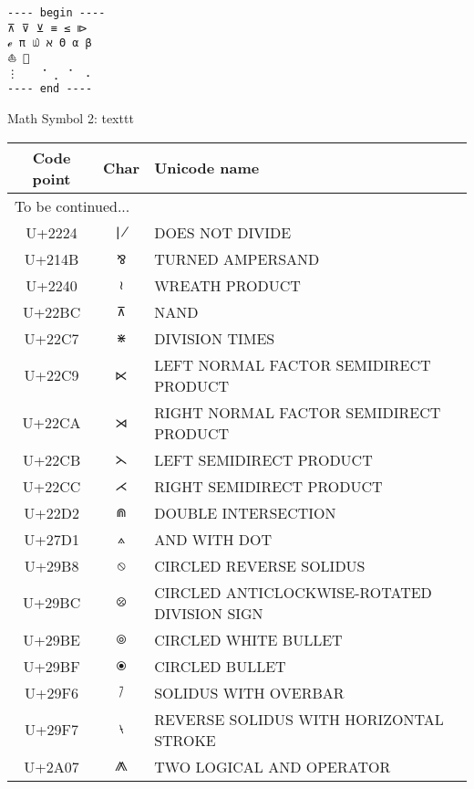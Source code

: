 \documentclass[a4paper]{article}
\begin{document}
\begin{verbatim}
---- begin ----
⊼ ⊽ ⊻ ≡ ≤ ⧐
ℯ π ௰ ℵ Θ α β
⛵ 🚀
⋮ ⠀ ⠈ ⡀ ⠁ ⠠
---- end ----
\end{verbatim}



{\Large Math Symbol 2: texttt}

\begin{longtable}{ccl}
  \toprule
  Code point & Char & Unicode name \\
  \hline \endhead
  \multicolumn{3}{l}{To be continued...} \\ 
  \midrule \endfoot
  \bottomrule \endlastfoot

  U+2224 & \texttt{∤}  & DOES NOT DIVIDE \\ \hline
  U+214B & \texttt{⅋}  & TURNED AMPERSAND \\ \hline
  U+2240 & \texttt{≀}  & WREATH PRODUCT \\ \hline
  U+22BC & \texttt{⊼}  & NAND \\ \hline
  U+22C7 & \texttt{⋇}  & DIVISION TIMES \\ \hline
  U+22C9 & \texttt{⋉}  & LEFT NORMAL FACTOR SEMIDIRECT PRODUCT \\ \hline
  U+22CA & \texttt{⋊}  & RIGHT NORMAL FACTOR SEMIDIRECT PRODUCT \\ \hline
  U+22CB & \texttt{⋋}  & LEFT SEMIDIRECT PRODUCT \\ \hline
  U+22CC & \texttt{⋌}  & RIGHT SEMIDIRECT PRODUCT \\ \hline
  U+22D2 & \texttt{⋒}  & DOUBLE INTERSECTION \\ \hline
  U+27D1 & \texttt{⟑}  & AND WITH DOT \\ \hline
  U+29B8 & \texttt{⦸}  & CIRCLED REVERSE SOLIDUS \\ \hline
  U+29BC & \texttt{⦼}  & CIRCLED ANTICLOCKWISE-ROTATED DIVISION SIGN \\ \hline
  U+29BE & \texttt{⦾}  & CIRCLED WHITE BULLET \\ \hline
  U+29BF & \texttt{⦿}  & CIRCLED BULLET \\ \hline
  U+29F6 & \texttt{⧶}  & SOLIDUS WITH OVERBAR \\ \hline
  U+29F7 & \texttt{⧷}  & REVERSE SOLIDUS WITH HORIZONTAL STROKE \\ \hline
  U+2A07 & \texttt{⨇}  & TWO LOGICAL AND OPERATOR \\ \hline

\end{longtable}
\end{document}
